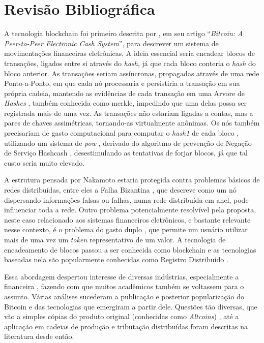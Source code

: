 \chapter{Revisão Bibliográfica}
A tecnologia blockchain foi primeiro descrita por , em seu artigo “\textit{Bitcoin: A Peer-to-Peer Electronic Cash System}”, para descrever um sistema de movimentações financeiras eletrônicas. A ideia essencial seria encadear blocos de transações, ligados entre si através do \textit{hash}, já que cada bloco conteria o \textit{hash} do bloco anterior. As transações seriam assíncronas, propagadas através de uma rede Ponto-a-Ponto, em que cada nó processaria e persistiria a transação em sua própria cadeia, mantendo as evidências de cada transação em uma Arvore de \emph{Hashes} \cite{Merkle1988}, também conhecida como \gls{merkle}, impedindo que uma delas possa ser registrada mais de uma vez. As transações não estariam ligadas a contas, mas a pares de chaves assimétricas, tornando-as virtualmente anônimas. Os nós também precisariam de gasto computacional para computar o \textit{\gls{hash1}} de cada bloco \cite{Nakamoto2008}, utilizando um sistema de \textit{\gls{pow}} \cite{gervais2016}, derivado do algoritmo de prevenção de Negação de Serviço Hashcash \cite{back2002}, desestimulando as tentativas de forjar blocos, já que tal custo seria muito elevado.

A estrutura pensada por Nakamoto estaria protegida contra problemas básicos de redes distribuídas, entre eles a Falha Bizantina \cite{Lamport1982}, que descreve como um nó dispersando informações falsas ou falhas, numa rede distribuída em anel, pode influenciar toda a rede. Outro problema potencialmente resolvível pela proposta, neste caso relacionado aos sistemas financeiros eletrônicos, e bastante relevante nesse contexto, é o problema do gasto duplo \cite{Brands}, que permite um usuário utilizar mais de uma vez um \textit{token} representativo de um valor. A tecnologia de encadeamento de blocos passou a ser conhecida como blockchain e as tecnologias baseadas nela são popularmente conhecidas como Registro Distribuído \cite{Sunyaev2020}.  

Essa abordagem despertou interesse de diversas indústrias, especialmente a financeira \cite{Cahill2020}, fazendo com que muitos acadêmicos também se voltassem para o assunto. Várias análises sucederam a publicação e posterior popularização do Bitcoin e das tecnologias que emergiram a partir dele. Questões tão diversas, que vão a simples cópias do produto original (conhecidas como \textit{Altcoins}) \cite{Nguyen2019}, até a aplicação em cadeias de produção e tributação distribuídas \cite{Choi2019} foram descritas na literatura desde então. 

